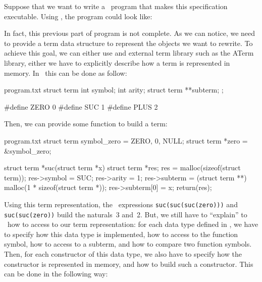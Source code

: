 \medskip
Suppose that we want to write a \C\ program that makes this
specification executable. 
Using \TOM, the program could look like:



In fact, this previous part of program is not complete. As we can
notice, we need to provide a term data structure to represent the
objects we want to rewrite.
To achieve this goal, we can either use and external term library such
as the ATerm library, either we have to explicitly describe how a term
is represented in memory.
In \C\, this can be done as follow:
\begin{verbatimwrite}{program.txt}
  struct term {
    int symbol;
    int arity;
    struct term **subterm;
  };

  #define ZERO 0
  #define SUC 1
  #define PLUS 2
\end{verbatimwrite}

Then, we can provide some function to build a term:

\begin{verbatimwrite}{program.txt}
  struct term symbol_zero = {ZERO, 0, NULL};
  struct term *zero = &symbol_zero;

  struct term *suc(struct term *x) {
    struct term *res;
    res = malloc(sizeof(struct term));
    res->symbol = SUC;
    res->arity = 1;
    res->subterm = (struct term **) malloc(1 * sizeof(struct term *));
    res->subterm[0] = x;
    return(res);
  }
\end{verbatimwrite}

Using this term representation, the \C\ expressions 
\texttt{suc(suc(suc(zero)))} and \texttt{suc(suc(zero))} build the
naturals~3 and~2.
But, we still have to ``explain'' to \TOM\ how to access to our term
representation: for each data type defined in \TOM, we have to specify
how this data type is implemented, how to access to the function
symbol, how to access to a subterm, and how to compare two function symbols.
Then, for each constructor of this data type, we also have to specify
how the constructor is represented in memory, and how to build such a constructor.
This can be done in the following way:

